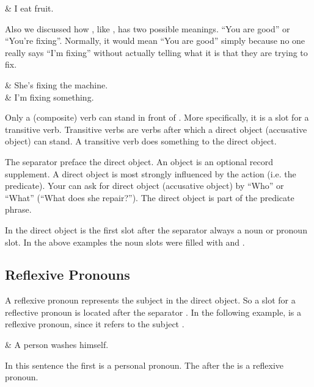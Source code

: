 \begin{translationtable}
     & I eat fruit. \\
\end{translationtable}
%
Also we discussed how , like , has two possible meanings.
``You are good'' or ``You're fixing''.
Normally, it would mean ``You are good'' simply because no one really says ``I'm fixing'' without actually telling what it is that they are trying to fix.

\begin{translationtable}
     & She's fixing the machine. \\
         & I'm fixing something.     \\
\end{translationtable}
%
Only a (composite) verb can stand in front of .
More specifically, it is a slot for a transitive verb.
Transitive verbs are verbs after which a direct object (accusative object) can stand.
A transitive verb does something to the direct object.

The separator  preface the direct object.
An object is an optional record supplement.
A direct object is most strongly influenced by the action (i.e\@. the predicate).
Your can ask for direct object (accusative object) by ``Who'' or ``What'' (``What does she repair?'').
The direct object is part of the predicate phrase.

In the direct object is the first slot after the separator  always a noun or pronoun slot.
In the above examples the noun slots were filled with  and .

\subsection*{Reflexive Pronouns}
A reflexive pronoun represents the subject in the direct object.
So a slot for a reflective pronoun is located after the separator .
In the following example,  is a reflexive pronoun, since it refers to the subject .

\begin{translationtable}
     & A person washes himself. \\
\end{translationtable}
%
In this sentence the first  is a personal pronoun.
The  after the  is a reflexive pronoun.

